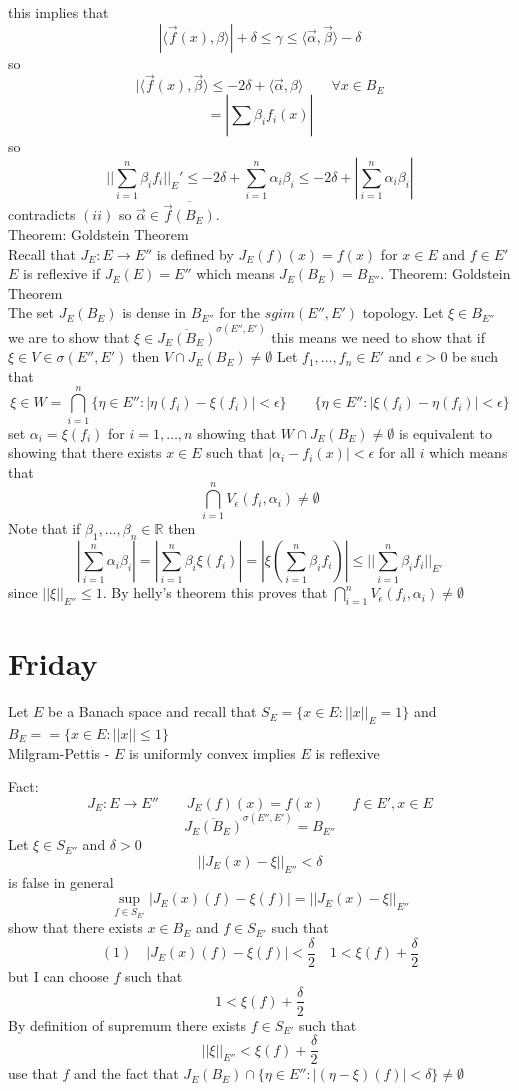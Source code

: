 \documentclass[11pt]{article}
\begin{document}
this implies that
\[
|\langle \vec f(x), \beta \rangle | + \delta \le \gamma \le \langle \vec \alpha, \vec \beta \rangle - \delta
\] 
so
\[
| \langle \vec f(x) , \vec \beta \rangle  \le -2 \delta + \langle \vec \alpha, \beta \rangle \qquad \forall x \in B_E
\] 
\[
= |\sum_{}^{}\beta_i f_i(x)|
\] 
so
\[
|| \sum_{i=1}^{n} \beta_i f_i ||_E' \le -2 \delta + \sum_{i=1}^{n} \alpha_i \beta_i \le -2 \delta + | \sum_{i=1}^{n} \alpha_i \beta _i|
\] 
contradicts $(ii)$ so  $\vec \alpha \in \overline{ \vec f(B_E)}$.\\
Theorem: Goldstein Theorem\\
Recall that $J_E: E \to E''$ is defined by  $J_E(f)(x) = f(x) $ for  $x \in E$ and  $f \in E'$
$E$ is reflexive if  $J_E(E) = E''$ which means $J_E(B_E) = B_{E''}$.
Theorem: Goldstein Theorem\\
The set  $J_E(B_E)$ is dense in  $B_{E''}$ for the  $sgim(E'', E')$ topology.
Let  $\xi \in B_{E''}$ we are to show that  $\xi \in \overline{J_E(B_E)}^{\sigma(E'',E')}$ this means we need to show that
if $\xi \in V \in \sigma(E'', E')$ then $V \cap J_E(B_E) \ne \emptyset$ 
Let $f_1,\dots,f_n \in E'$ and $\epsilon > 0$ be such that
\[
    \xi \in W = \bigcap_{i=1}^{n}\{\eta \in E'' : |\eta(f_i) - \xi(f_i)| < \epsilon\}  \qquad \{\eta \in E'': |\xi(f_i) - \eta(f_i)| < \epsilon\}
\] 
set $\alpha_i = \xi(f_i) $ for $i = 1,\dots,n$ showing that $W \cap J_E(B_E) \ne \emptyset$ is equivalent to
showing that there exists  $x \in E$ such that  $|\alpha_i - f_i(x)| < \epsilon$ for all $i$ which means that
 \[
     \bigcap_{i=1}^{n}V_\epsilon(f_i, \alpha_i) \ne \emptyset
\] 
Note that if $\beta_1,\dots,\beta_n \in  \mathbb{R}$ then
\[
    |\sum_{i=1}^{n}\alpha_i \beta_i| = |\sum_{i=1}^{n} \beta_i \xi(f_i)| = | \xi( \sum_{i=1}^{n} \beta_i f_i)| \le || \sum_{i=1}^{n} \beta_i f_i||_{E'}
\] 
since $||\xi||_{E''} \le 1$. By helly's theorem this proves that $\bigcap_{i=1}^{n}V_\epsilon(f_i, \alpha_i) \ne \emptyset$

\section{Friday}
Let $E$ be a Banach space and recall that $S_E = \{x \in E: ||x||_E = 1\}$ and  $B_E == \{x \in E: ||x|| \le 1\}$\\
Milgram-Pettis -  $E$ is uniformly convex implies $E$ is reflexive

Fact: 
\[
J_E : E \to E'' \qquad J_E(f)(x) = f(x) \qquad f \in E', x \in E
\] 
\[
    \overline{J_E(B_E)}^{\sigma(E'',E')} = B_{E''}
\] 
Let $\xi \in S_{E''}$ and  $\delta > 0$
\[
    ||J_E(x) - \xi||_{E''} < \delta
\] 
is false in general
\[
    \sup_{f \in S_{E'}}|J_E(x)(f) - \xi(f)| = ||J_E(x) - \xi||_{E''}
\] 
show that there exists $x \in B_E$ and  $f \in S_{E'}$ such that
\[
    (1) \quad |J_E(x)(f) - \xi(f)| < \frac{\delta}{2} \quad 1 < \xi(f) + \frac{\delta}{2}
\] 
but I can choose $f$ such that 
\[
1 < \xi(f) + \frac{\delta}{2}
\] 
By definition of supremum there exists $f \in S_{E'}$ such that
 \[
     ||\xi||_{E''} < \xi(f) + \frac{\delta}{2}
\] 
use that $f$ and the fact that  $J_E(B_E) \cap \{\eta \in E'': |(\eta - \xi)(f)| < \delta\} \ne \emptyset$
\end{document}
